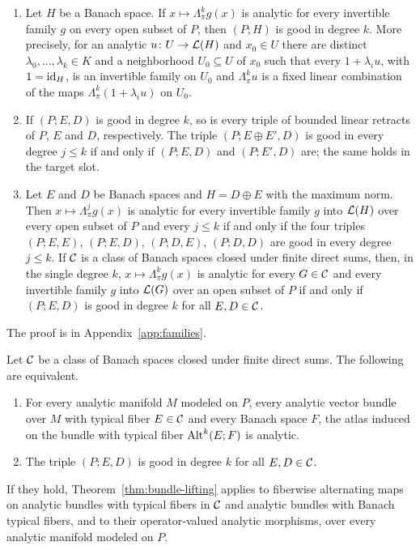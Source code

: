 \begin{proposition}[reductions]\label{fam2:prop:reductions}
\begin{enumerate}
\item Let $H$ be a Banach space. If $x\mapsto\Lambda^k_\pi g(x)$ is analytic for every invertible family $g$ on every open
subset of $P$, then $(P;H)$ is good in degree $k$. More precisely, for an analytic $u\colon U\to\mathcal L(H)$ and $x_0\in U$ there
are distinct $\lambda_0,\dots,\lambda_k\in K$ and a neighborhood $U_0\subseteq U$ of $x_0$ such that every $1+\lambda_iu$,
with $1=\mathrm{id}_H$, is an invertible family on $U_0$ and $\Lambda^k_\pi u$ is a fixed linear combination of the maps
$\Lambda^k_\pi(1+\lambda_iu)$ on $U_0$.
\item If $(P;E,D)$ is good in degree $k$, so is every triple of bounded linear retracts of $P$, $E$ and $D$, respectively.
The triple $(P;E\oplus E',D)$ is good in every degree $j\le k$ if and only if $(P;E,D)$ and $(P;E',D)$ are; the same holds
in the target slot.
\item Let $E$ and $D$ be Banach spaces and $H=D\oplus E$ with the maximum norm. Then $x\mapsto\Lambda^j_\pi g(x)$ is analytic
for every invertible family $g$ into $\mathcal L(H)$ over every open subset of $P$ and every $j\le k$ if and only if
the four triples $(P;E,E)$, $(P;E,D)$, $(P;D,E)$, $(P;D,D)$ are good in every degree $j\le k$. If $\mathcal{C}$ is a class of Banach spaces closed
under finite direct sums, then, in the single degree $k$, $x\mapsto\Lambda^k_\pi g(x)$ is analytic for every $G\in\mathcal{C}$ and
every invertible family $g$ into $\mathcal L(G)$ over an open subset of $P$ if and only if $(P;E,D)$ is good in degree $k$ for
all $E,D\in\mathcal{C}$.
\end{enumerate}
\end{proposition}

The proof is in Appendix~\ref{app:families}.

\begin{corollary}\label{fam2:cor:bundles}
Let $\mathcal{C}$ be a class of Banach spaces closed under finite direct sums. The following are equivalent.
\begin{enumerate}
\item For every analytic manifold $M$ modeled on $P$, every analytic vector bundle over $M$ with typical fiber $E\in\mathcal{C}$ and
every Banach space $F$, the atlas induced on the bundle with typical fiber $\operatorname{Alt}^k(E;F)$ is analytic.
\item The triple $(P;E,D)$ is good in degree $k$ for all $E,D\in\mathcal{C}$.
\end{enumerate}
If they hold, Theorem~\ref{thm:bundle-lifting} applies to fiberwise alternating maps on analytic bundles with typical
fibers in $\mathcal{C}$ and analytic bundles with Banach typical fibers, and to their operator-valued analytic morphisms, over every
analytic manifold modeled on $P$.
\end{corollary}

